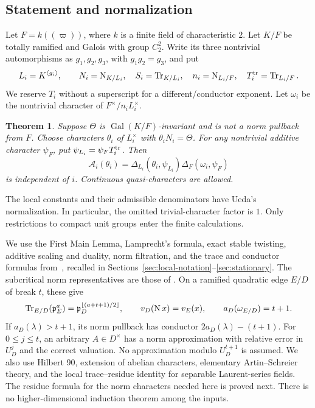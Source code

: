 \documentclass[11pt]{amsart}
\newtheorem{theorem}{Theorem}[section]
\theoremstyle{definition}
\theoremstyle{remark}
\newcommand{\Tr}{\operatorname{Tr}}
\newcommand{\Nm}{\operatorname{N}}
\newcommand{\Gal}{\operatorname{Gal}}
\newcommand{\floor}[1]{\left\lfloor #1\right\rfloor}
\begin{document}
\subsection{Statement and normalization}
Let $F=k((\varpi))$, where $k$ is a finite field of characteristic $2$.
Let $K/F$ be totally ramified and Galois with group $C_2^2$.
Write its three nontrivial automorphisms as $g_1,g_2,g_3$, with
$g_1g_2=g_3$, and put
\[
 L_i=K^{\langle g_i\rangle},\qquad
 N_i=\Nm_{K/L_i},\quad S_i=\Tr_{K/L_i},\quad
 n_i=\Nm_{L_i/F},\quad T_i^{\rm tr}=\Tr_{L_i/F}.
\]
We reserve $T_i$ without a superscript for a different/conductor exponent.
Let $\omega_i$ be the nontrivial character of
$F^\times/n_iL_i^\times$.
\begin{theorem}\label{D:EQ:main}
Suppose $\Theta$ is $\Gal(K/F)$-invariant and is not a norm pullback
from $F$. Choose characters $\theta_i$ of $L_i^\times$ with
$\theta_iN_i=\Theta$. For any nontrivial additive character $\psi_F$,
put $\psi_{L_i}=\psi_FT_i^{\rm tr}$. Then
\begin{equation}\label{D:EQ:Adef}
 \mathcal A_i(\theta_i)=
 \Delta_{L_i}(\theta_i,\psi_{L_i})\Delta_F(\omega_i,\psi_F)
\end{equation}
is independent of $i$. Continuous quasi-characters are allowed.
\end{theorem}
The local constants and their admissible denominators have Ueda's
normalization. In particular, the omitted trivial-character factor is $1$.
Only restrictions to compact unit groups enter the finite calculations.

We use the First Main Lemma, Lamprecht's formula, exact stable
twisting, additive scaling and duality, norm filtration, and the
trace and conductor formulas from~\cite{Ueda}, recalled in
Sections~\ref{sec:local-notation}--\ref{sec:stationary}.
The subcritical norm representatives are those of
\cite[Lemma~6.6]{Ueda}.
On a ramified quadratic edge $E/D$ of break $t$, these give
\begin{equation}\label{D:EQ:edge}
 \Tr_{E/D}(\pp_E^a)=\pp_D^{\floor{(a+t+1)/2}},\qquad
 v_D(\Nm x)=v_E(x),\qquad a_D(\omega_{E/D})=t+1.
\end{equation}
If $a_D(\lambda)>t+1$, its norm pullback has conductor
$2a_D(\lambda)-(t+1)$. For $0\le j\le t$, an arbitrary $A\in D^\times$
has a norm approximation with relative error in $U_D^j$ and the correct
valuation. No approximation modulo $U_D^{t+1}$ is assumed.
We also use Hilbert 90, extension of abelian characters, elementary
Artin--Schreier theory, and the local trace--residue identity for
separable Laurent-series fields. The residue formula for the norm
characters needed here is proved next. There is no higher-dimensional
induction theorem among the inputs.
\end{document}

